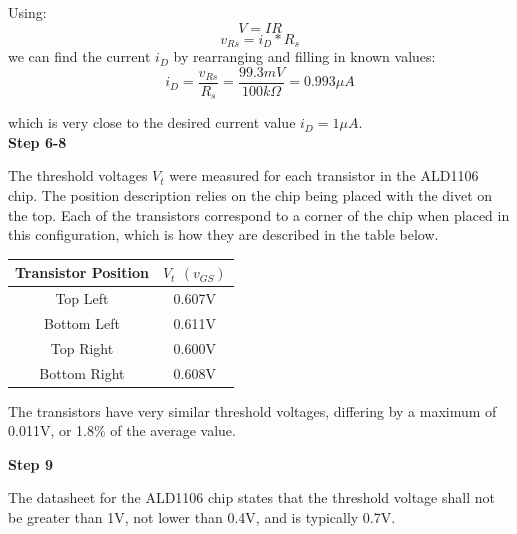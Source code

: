 \documentclass[notitlepage, 12pt]{report}  %
\begin{document}
Using:\\
\begin{equation}
    V = IR 
\end{equation}
\begin{equation}
    v_{Rs} = i_D * R_s
\end{equation}
we can find the current $i_D$ by rearranging and filling in known values:\\

\begin{equation}
    i_D = \frac{v_{Rs}}{R_s} = \frac{99.3 mV}{100k\Omega} = 0.993\mu A
\end{equation}

which is very close to the desired current value $i_D = 1\mu A$. \\

\textbf{Step 6-8}

The threshold voltages $V_t$ were measured for each transistor in the ALD1106 chip.
The position description relies on the chip being placed with the divet on the top. Each of the 
transistors correspond to a corner of the chip when placed in this configuration, which is how
they are described in the table below. \\

\begin{table}[h!]
    \begin{center}
        \begin{tabular}{c|c}
            Transistor Position & $V_t$ $(v_{GS})$ \\
            \hline
            Top Left            & 0.607V           \\
            Bottom Left         & 0.611V           \\
            Top Right           & 0.600V           \\
            Bottom Right        & 0.608V          
        \end{tabular}
    \end{center}
\end{table}

The transistors have very similar threshold voltages, differing by a maximum of 0.011V, or 1.8\% of the average value.

\textbf{Step 9}

The datasheet for the ALD1106 chip states that the threshold voltage shall not be greater than 1V, not 
lower than 0.4V, and is typically 0.7V.\cite{datasheet} \\
\end{document}
